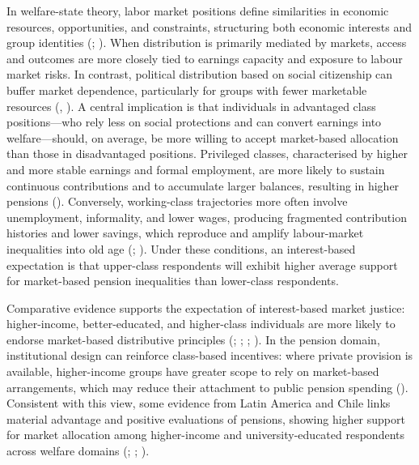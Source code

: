\documentclass[
  12pt,
]{article}
\begin{document}
In welfare-state theory, labor market positions define similarities in
economic resources, opportunities, and constraints, structuring both
economic interests and group identities
(;
). When distribution
is primarily mediated by markets, access and outcomes are more closely
tied to earnings capacity and exposure to labour market risks. In
contrast, political distribution based on social citizenship can buffer
market dependence, particularly for groups with fewer marketable
resources (,
). A central implication is
that individuals in advantaged class positions---who rely less on social
protections and can convert earnings into welfare---should, on average,
be more willing to accept market-based allocation than those in
disadvantaged positions. Privileged classes, characterised by higher and
more stable earnings and formal employment, are more likely to sustain
continuous contributions and to accumulate larger balances, resulting in
higher pensions (). Conversely, working-class trajectories more often
involve unemployment, informality, and lower wages, producing fragmented
contribution histories and lower savings, which reproduce and amplify
labour-market inequalities into old age
(; ). Under these
conditions, an interest-based expectation is that upper-class
respondents will exhibit higher average support for market-based pension
inequalities than lower-class respondents.

Comparative evidence supports the expectation of interest-based market
justice: higher-income, better-educated, and higher-class individuals
are more likely to endorse market-based distributive principles
(;
;
;
). In the
pension domain, institutional design can reinforce class-based
incentives: where private provision is available, higher-income groups
have greater scope to rely on market-based arrangements, which may
reduce their attachment to public pension spending
().
Consistent with this view, some evidence from Latin America and Chile
links material advantage and positive evaluations of pensions, showing
higher support for market allocation among higher-income and
university-educated respondents across welfare domains
(;
;
).
\end{document}
